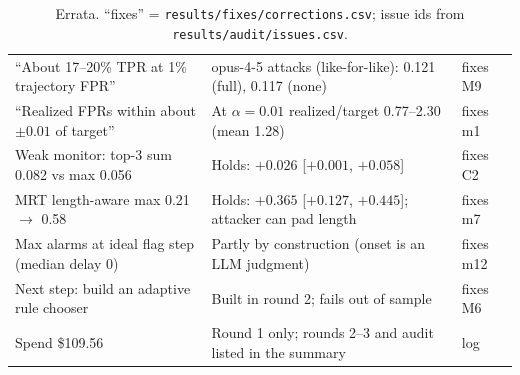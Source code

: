 \documentclass[11pt]{article}
\begin{document}
\begin{table}[!htbp]
\begin{tabularx}{\linewidth}{@{}>{\raggedright\arraybackslash}p{5.2cm}>{\raggedright\arraybackslash}X>{\raggedright\arraybackslash}p{2.7cm}@{}}
``About 17--20\% TPR at 1\% trajectory FPR'' & opus-4-5 attacks (like-for-like): 0.121 (full), 0.117 (none) & fixes M9\\
``Realized FPRs within about $\pm0.01$ of target'' & At $\alpha=0.01$ realized/target 0.77--2.30 (mean 1.28) & fixes m1\\
Weak monitor: top-3 sum 0.082 vs max 0.056 & Holds: $+0.026$ [$+0.001$, $+0.058$] & fixes C2\\
MRT length-aware max 0.21 $\to$ 0.58 & Holds: $+0.365$ [$+0.127$, $+0.445$]; attacker can pad length & fixes m7\\
Max alarms at ideal flag step (median delay 0) & Partly by construction (onset is an LLM judgment) & fixes m12\\
Next step: build an adaptive rule chooser & Built in round 2; fails out of sample & fixes M6\\
Spend \$109.56 & Round 1 only; rounds 2--3 and audit listed in the summary & log\\
\bottomrule
\end{tabularx}
\caption{Errata. ``fixes'' = \nolinkurl{results/fixes/corrections.csv}; issue ids from \nolinkurl{results/audit/issues.csv}.}\label{tab:errata}
\end{table}
\end{document}
